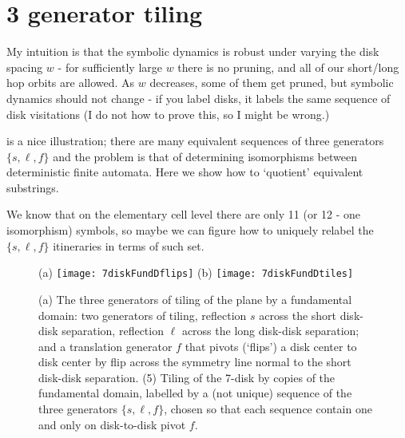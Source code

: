 
	
\chapter{3 generator tiling}
\label{c-3gener}

My intuition is that the symbolic dynamics is robust under varying
the disk spacing $w$ - for sufficiently large $w$ there is no pruning, and all
of our short/long hop orbits are allowed. As $w$ decreases, some of them get pruned,
but symbolic dynamics should not change - if you label disks, it labels the same
sequence of disk visitations (I do not how to prove this, so I might be wrong.)

 is a nice illustration; there are
many equivalent sequences of three generators $\{s,\ell,f\}$ and
the problem is that of determining isomorphisms between deterministic
finite automata. Here we show how to `quotient' equivalent
substrings.

We know that on the elementary
cell level there are only 11 (or 12 -  one isomorphism) symbols, so maybe
we can figure how to uniquely relabel the $\{s,\ell,f\}$ itineraries in
terms of such set.


\begin{figure}
\begin{center}
(a) \texttt{[image: 7diskFundDflips]}
(b) \texttt{[image: 7diskFundDtiles]}
\end{center}
\caption{
(a) The three generators of tiling of the plane by a fundamental domain:
two generators of  tiling, reflection $s$ across the short
disk-disk separation, reflection  $\ell$  across the long disk-disk
separation;
and
a translation generator $f$ that pivots (`flips') a disk center to disk
center by flip across the symmetry line normal to the short disk-disk
separation.
(5) Tiling of the 7-disk by copies of the fundamental domain, labelled
by a (not unique) sequence of the three generators
$\{s,\ell,f\}$, chosen so that each sequence contain one and only on
    disk-to-disk pivot $f$.
        }
\label{7diskFundDflipsA}
\end{figure}

